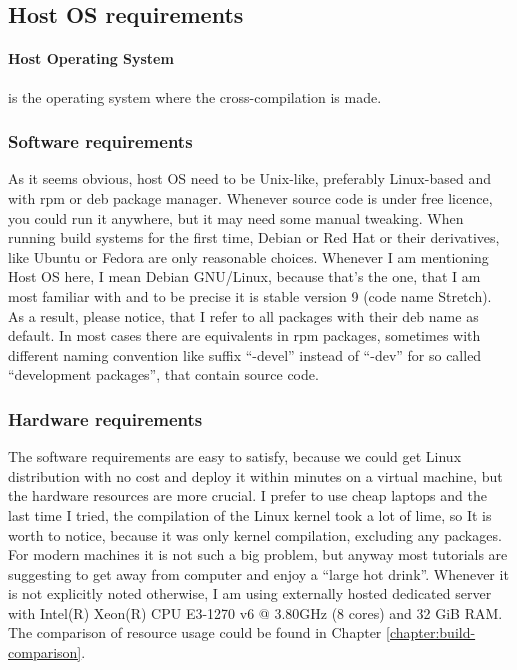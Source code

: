 \documentclass[printmode]{mgr}
\begin{document}
\subsection*{Host OS requirements}

\paragraph{Host Operating System} is the operating system where the cross-compilation is made.

\subsubsection{Software requirements}
As it seems obvious, host OS need to be Unix-like, preferably Linux-based and with rpm or deb package manager. Whenever source code is under free licence, you could run it anywhere, but it may need some manual tweaking. When running build systems for the first time, Debian or Red Hat or their derivatives, like Ubuntu or Fedora are only reasonable choices. Whenever I am mentioning Host OS here, I mean Debian GNU/Linux, because that's the one, that I am most familiar with and to be precise it is stable version 9 (code name Stretch). As a result, please notice, that I refer to all packages with their deb name as default. In most cases there are equivalents in rpm packages, sometimes with different naming convention like suffix ``-devel'' instead of ``-dev'' for so called ``development packages'', that contain source code.

\subsubsection{Hardware requirements}
The software requirements are easy to satisfy, because we could get Linux distribution with no cost and deploy it within minutes on a virtual machine, but the hardware resources are more crucial. I prefer to use cheap laptops and the last time I tried, the compilation of the Linux kernel took a lot of lime, so It is worth to notice, because it was only kernel compilation, excluding any packages. For modern machines it is not such a big problem, but anyway most tutorials are suggesting to get away from computer and enjoy a ``large hot drink''. Whenever it is not explicitly noted otherwise, I am using externally hosted dedicated server with Intel(R) Xeon(R) CPU E3-1270 v6 @ 3.80GHz (8 cores) and 32 GiB RAM. The comparison of resource usage could be found in Chapter \ref{chapter:build-comparison}.
\end{document}
